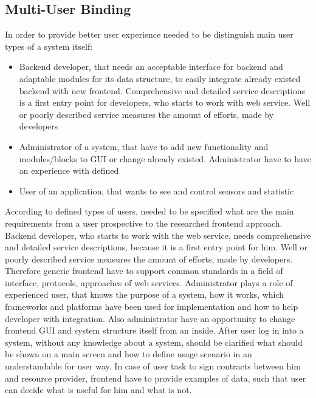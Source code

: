 \subsection {Multi-User Binding}
	In order to provide better user experience needed to be distinguish main user types of a system itself:
	\begin{itemize}
	\item Backend developer, that needs an acceptable interface for backend and adaptable modules for its data structure, to easily 
	      integrate already existed backend with new frontend. Comprehensive and detailed service descriptions is a first entry point for developers, who starts to work with web service. Well or poorly described service measures the amount of efforts, made by developers
	\item Administrator of a system, that have to add new functionality and modules/blocks to GUI or change already existed.     
	      Administrator have to have an experience with defined 
	\item User of an application, that wants to see and control sensors and statistic
	\end{itemize}
	According to defined types of users, needed to be specified what are the main requirements from a user prospective to the researched frontend approach.
	\newline 
	Backend developer, who starts to work with the web service, needs comprehensive and detailed service descriptions, because it is a first entry point for him. Well or poorly described service measures the amount of efforts, made by developers. Therefore generic frontend have to support common standards in a field of interface, protocols, approaches of web services.
	\newline
	Administrator plays a role of experienced user, that knows the purpose of a system, how it works, which frameworks and platforms have been used for implementation and how to help developer with integration. Also administrator have an opportunity to change frontend GUI and system structure itself from an inside.
	\newline
	After user log in into a system, without any knowledge about a system, should be clarified what should be shown on a main screen and how to define usage scenario in an understandable for user way. In case of user task to sign contracts between him and resource provider, frontend have to provide examples of data, such that user can decide what is useful for him and what is not.

